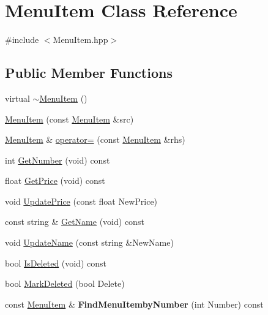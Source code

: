 \hypertarget{classMenuItem}{\section{Menu\-Item Class Reference}
\label{classMenuItem}
}


{\ttfamily \#include $<$Menu\-Item.\-hpp$>$}

\subsection*{Public Member Functions}
\begin{DoxyCompactItemize}
\item 
virtual \hyperlink{classMenuItem_a41c6086a4d066256ecb7bfa715059ea2}{$\sim$\-Menu\-Item} ()
\item 
\hyperlink{classMenuItem_a502e53d939dcf20757666b059cba9664}{Menu\-Item} (const \hyperlink{classMenuItem}{Menu\-Item} \&src)
\item 
\hyperlink{classMenuItem}{Menu\-Item} \& \hyperlink{classMenuItem_a68edba703c28553a8d929407ddce5d94}{operator=} (const \hyperlink{classMenuItem}{Menu\-Item} \&rhs)
\item 
int \hyperlink{classMenuItem_aac2b3c2395c2e4e6126a885c9613afba}{Get\-Number} (void) const 
\item 
float \hyperlink{classMenuItem_a1079d7b1a336e62a02e7fcdbcf0adfa7}{Get\-Price} (void) const 
\item 
void \hyperlink{classMenuItem_a434d85549390ce6fd10c370403607812}{Update\-Price} (const float New\-Price)
\item 
const string \& \hyperlink{classMenuItem_afb088804ca10808f8039303814e8ac59}{Get\-Name} (void) const 
\item 
void \hyperlink{classMenuItem_a9657a4b4274f27e5210524ebfd724248}{Update\-Name} (const string \&New\-Name)
\item 
bool \hyperlink{classMenuItem_a53b89f5c25bba630a2ab169f3c6b4f3c}{Is\-Deleted} (void) const 
\item 
bool \hyperlink{classMenuItem_aeef040758879fcf8509c277fb88ceb4d}{Mark\-Deleted} (bool Delete)
\item 
\hypertarget{classMenuItem_a4738e0e464e49c9e4515305d6caa0075}{const \hyperlink{classMenuItem}{Menu\-Item} \& {\bfseries Find\-Menu\-Itemby\-Number} (int Number) const }\label{classMenuItem_a4738e0e464e49c9e4515305d6caa0075}

\end{DoxyCompactItemize}
